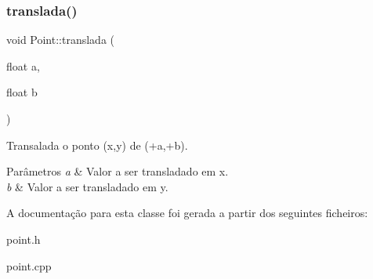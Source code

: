\subsubsection{\texorpdfstring{translada()}{translada()}}
{\footnotesize\ttfamily void Point\+::translada (\begin{DoxyParamCaption}\item[{float}]{a,  }\item[{float}]{b }\end{DoxyParamCaption})}



Transalada o ponto (x,y) de (+a,+b). 


\begin{DoxyParams}{Parâmetros}
{\em a} & Valor a ser transladado em x. \\
\hline
{\em b} & Valor a ser transladado em y. \\
\hline
\end{DoxyParams}


A documentação para esta classe foi gerada a partir dos seguintes ficheiros\+:\begin{DoxyCompactItemize}
\item 
point.\+h\item 
point.\+cpp\end{DoxyCompactItemize}
